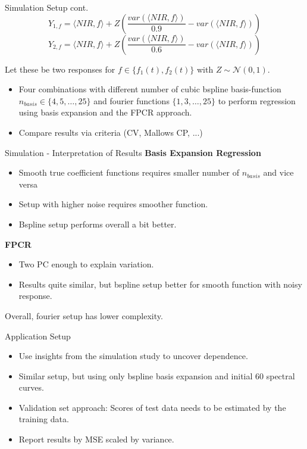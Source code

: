 \documentclass{beamer}
\begin{document}
	
	\begin{frame}{Simulation Setup cont.}
		$$Y_{1,f} = \langle NIR, f\rangle + Z\left(  \frac{var(\langle NIR, f\rangle)}{0.9} - var(\langle NIR, f\rangle)\right)$$ 
		$$Y_{2,f} = \langle NIR, f\rangle + Z\left( \frac{var(\langle NIR, f\rangle)}{0.6} - var(\langle NIR, f\rangle)\right)$$
		
		Let these be two responses for $f \in \{f_1(t), f_2(t)\}$ with $Z \sim \mathcal{N}(0,1)$.	
		\vspace{0.2cm}
		
		\begin{itemize}
    		\item Four combinations with different number of cubic bspline basis-function $n_{basis} \in \{4,5, \dots ,25\}$ and fourier functions $\{1,3, \dots, 25\}$ to perform regression using basis expansion and the FPCR approach.
			\item Compare results via criteria (CV, Mallows CP, ...)
		
		\end{itemize}
	\end{frame}
	
	\begin{frame}{Simulation - Interpretation of Results}\label{Results}
		\textbf{Basis Expansion Regression}
		\begin{itemize}
    			\item Smooth true coefficient functions requires smaller number of $n_{basis}$ and vice versa
    			\item Setup with higher noise requires smoother function.
    			\item  Bspline setup performs overall a bit better.
		\end{itemize}
	
		\textbf{FPCR}
    	\begin{itemize}
    		\item Two PC enough to explain variation.
    		\item Results quite similar, but bspline setup better for smooth function with noisy response.
    	\end{itemize}
    
    	Overall, fourier setup has lower complexity.
    	
    	\hyperlink{Simulation}{}
    	\hyperlink{Simulation2}{}
	\end{frame}

	\begin{frame}{Application Setup}
		\begin{itemize}
			\item Use insights from the simulation study to uncover dependence.
			\item Similar setup, but using only bspline basis expansion and initial 60 spectral curves.
			\item Validation set approach:	Scores of test data needs to be estimated by the training data. 
			\item Report results by MSE scaled by variance.
		\end{itemize}
	\end{frame}
	
\end{document}
